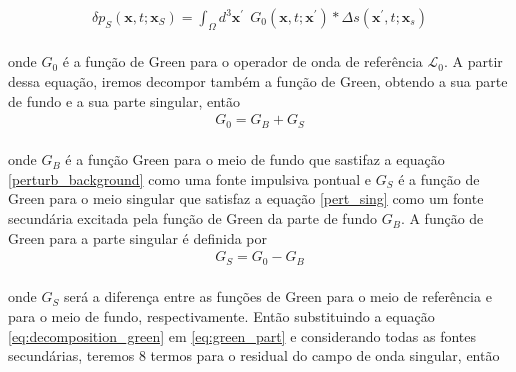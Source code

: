 \begin{eqnarray}
 \delta p_{S} (\mathbf{x},t;\mathbf{x}_{S}) = \int _{\Omega} d^{3} \mathbf{x}^{\prime}~~ G_{0}(\mathbf{x},t;\mathbf{x}^{\prime})  * \Delta s (\mathbf{x}^{\prime},t;\mathbf{x}_{s})
 \label{eq:green_part}
\end{eqnarray}
\\
onde $G_{0}$ é a função de Green para o operador de onda de referência $\mathcal{L}_{0}$. A partir dessa equação, iremos decompor também a função de Green, obtendo a sua parte de fundo e a sua parte singular, então  \\
\begin{eqnarray}
\label{eq:decomposition_green}
 G_{0} = G_{B} + G_{S}
\end{eqnarray}
\\
onde $G_{B}$ é a função Green para o meio de fundo que sastifaz a equação \ref{perturb_background} como uma fonte impulsiva pontual e $G_{S}$ é a função de Green para o meio singular que satisfaz a equação \ref{pert_sing} como um fonte secundária excitada pela função de Green da parte de fundo $G_{B}$. A função de Green para a parte singular é definida por \\
\begin{eqnarray}
 G_{S} = G_{0} - G_{B}
\end{eqnarray}
\\
onde $G_{S}$ será a diferença entre as funções de Green para o meio de referência e para o meio de fundo, respectivamente. Então substituindo a equação \ref{eq:decomposition_green} em \ref{eq:green_part} e considerando todas as fontes secundárias, teremos 8 termos para o residual do campo de onda singular, então

